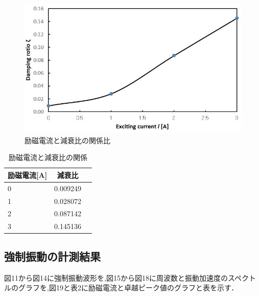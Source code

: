 \documentclass[a4paper,10.5pt]{jsarticle}
\begin{document}
\begin{figure}[h]
  \centering
  \includegraphics[width=13cm]{6.png}
  \caption{励磁電流と減衰比の関係比}
\end{figure}
\newpage
\begin{table}[h]
  \centering
  \caption{励磁電流と減衰比の関係}
  \begin{tabular}{l|c|r}
    励磁電流[A]&減衰比\\\hline\hline
      0&0.009249 \\ \hline
      1&0.028072  \\
      2&0.087142  \\
      3&0.145136  \\\hline
  \end{tabular}
\end{table}


\subsection{強制振動の計測結果}
図11から図14に強制振動波形を,図15から図18に周波数と振動加速度のスペクトルのグラフを,図19と表2に励磁電流と卓越ピーク値のグラフと表を示す．
\end{document}
